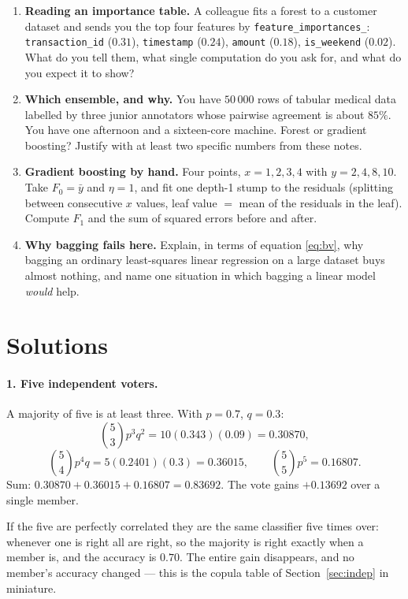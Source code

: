 \documentclass[11pt]{article}
\begin{document}
\begin{enumerate}[leftmargin=*]
  \item \textbf{Reading an importance table.} A colleague fits a forest to a
    customer dataset and sends you the top four features by
    \texttt{feature\_importances\_}: \texttt{transaction\_id} ($0.31$),
    \texttt{timestamp} ($0.24$), \texttt{amount} ($0.18$),
    \texttt{is\_weekend} ($0.02$). What do you tell them, what single
    computation do you ask for, and what do you expect it to show?

  \item \textbf{Which ensemble, and why.} You have $50\,000$ rows of tabular
    medical data labelled by three junior annotators whose pairwise agreement
    is about $85\%$. You have one afternoon and a sixteen-core machine.
    Forest or gradient boosting? Justify with at least two specific numbers
    from these notes.

  \item \textbf{Gradient boosting by hand.} Four points, $x = 1,2,3,4$ with
    $y = 2, 4, 8, 10$. Take $F_0 = \bar y$ and $\eta = 1$, and fit one
    depth-1 stump to the residuals (splitting between consecutive $x$ values,
    leaf value $=$ mean of the residuals in the leaf). Compute $F_1$ and the
    sum of squared errors before and after.

  \item \textbf{Why bagging fails here.} Explain, in terms of equation
    \eqref{eq:bv}, why bagging an ordinary least-squares linear regression on
    a large dataset buys almost nothing, and name one situation in which
    bagging a linear model \emph{would} help.
\end{enumerate}

\section{Solutions}
\label{sec:solutions}

\paragraph{1. Five independent voters.}
A majority of five is at least three. With $p = 0.7$, $q = 0.3$:
\[
  \binom{5}{3}p^3q^2 = 10(0.343)(0.09) = 0.30870,
\]
\[
  \binom{5}{4}p^4q = 5(0.2401)(0.3) = 0.36015,
  \qquad
  \binom{5}{5}p^5 = 0.16807.
\]
Sum: $0.30870 + 0.36015 + 0.16807 = \mathbf{0.83692}$. The vote gains
$+0.13692$ over a single member.

If the five are perfectly correlated they are the same classifier five times
over: whenever one is right all are right, so the majority is right exactly
when a member is, and the accuracy is $\mathbf{0.70}$. The entire gain
disappears, and no member's accuracy changed --- this is the copula table of
Section~\ref{sec:indep} in miniature.
\end{document}
